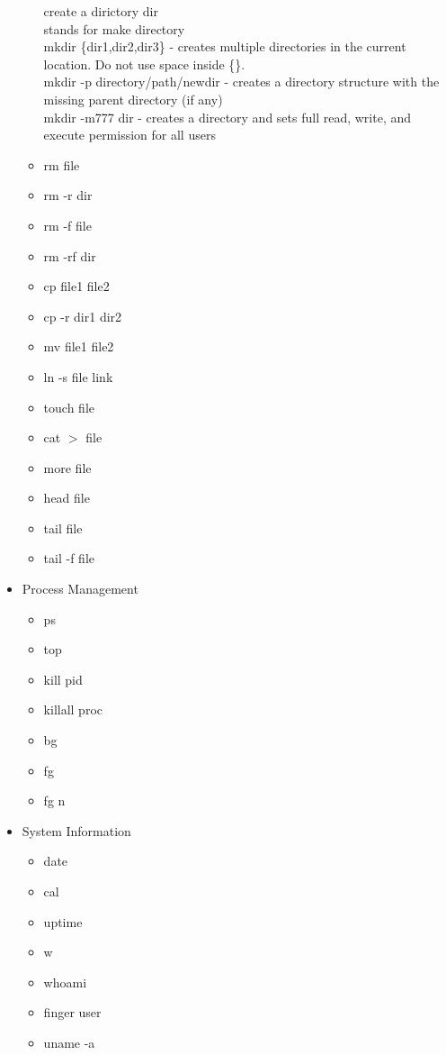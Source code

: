\documentclass{article}
\begin{document}
\begin{itemize}
\begin{itemize}
					create a dirictory dir\\
					stands for make directory\\
					mkdir \{dir1,dir2,dir3\} - creates multiple directories in the current location. Do not use space inside \{\}. \\
					mkdir -p directory/path/newdir - creates a directory structure with the missing parent directory (if any)\\
					mkdir -m777 dir - creates a directory and sets full read, write, and execute permission for all users \\
				\item rm file 
				\item rm -r dir
				\item rm -f file
				\item rm -rf dir
				\item cp file1 file2
				\item cp -r dir1 dir2
				\item mv file1 file2
				\item ln -s file link
				\item touch file
				\item cat {$>$} file
				\item more file
				\item head file
				\item tail file
				\item tail -f file 
			\end{itemize}
		\item Process Management
			\begin{itemize}
				\item ps 
				\item top
				\item kill pid
				\item killall proc
				\item bg
				\item fg
				\item fg n
			\end{itemize}
		\item System Information
			\begin{itemize}
				\item date
				\item cal
				\item uptime
				\item w
				\item whoami
				\item finger user
				\item uname -a

\end{itemize}
\end{itemize}
\end{document}
